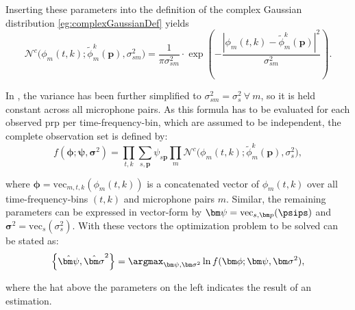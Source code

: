 Inserting these parameters into the definition of the complex Gaussian distribution \eqref{eg:complexGaussianDef} yields
\begin{equation}
    \mathcal{N}^c\big(\phi_m(t,k);\tilde\phi_m^k(\bm p),\sigma_{sm}^2\big)=\frac{1}{\pi\sigma_{sm}^2}\cdot\exp\left (-\frac{\left|\phi_m(t,k)-\tilde\phi_m^k(\bm p)\right|^2}{\sigma_{sm}^2} \right ).
\label{eq:gaussian}
\end{equation}

In \cite{Schwartz2014}, the variance has been further simplified to $\sigma_{sm}^2=\sigma_s^2\ \forall\ m$, so it is held constant across all microphone pairs. As this formula has to be evaluated for each observed \gls{prp} per time-frequency-bin, which are assumed to be independent, the complete observation set is defined by:
\begin{equation}
    f(\bm\phi;\bm\psi,\bm\sigma^2)=\prod_{t,k}\sum_{s,\bm p}\psi_{s\bm p}\prod_m\mathcal{N}^c\big(\phi_m(t,k);\tilde\phi^k_m(\bm p),\sigma^2_{s}\big),
\end{equation}

where $\bm\phi=\text{vec}_{m,t,k}(\phi_m(t,k))$ is a concatenated vector of $\phi_m(t,k)$ over all time-frequency-bins $(t,k)$ and microphone pairs $m$. Similar, the remaining parameters can be expressed in vector-form by $\bm\psi=\text{vec}_{s,\bm p}(\psips)$ and $\bm\sigma^2=\text{vec}_{s}(\sigma_s^2)$. With these vectors the optimization problem to be solved can be stated as:
\begin{equation}
    \left\{\hat{\bm\psi},\hat{\bm\sigma}^2\right\}=\argmax_{\bm\psi, \bm\sigma^2}\ln f(\bm\phi;\bm\psi,\bm\sigma^2),
\label{eq:mle}
\end{equation}

where the hat above the parameters on the left indicates the result of an estimation.

